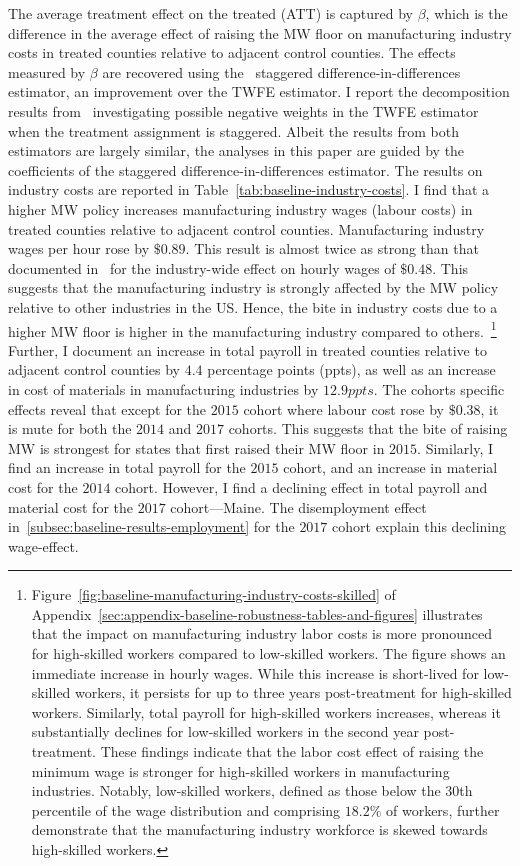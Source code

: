 \documentclass[12pt, english]{article}
\begin{document}
    The average treatment effect on the treated (ATT) is captured by $\beta$, which is the difference in the average effect of raising the MW floor on manufacturing industry costs in treated counties relative to adjacent control counties. The effects measured by $\beta$ are recovered using the~\cite{sun2021estimating} staggered difference-in-differences estimator, an improvement over the TWFE estimator. I report the decomposition results from~\cite{de2020two} investigating possible negative weights in the TWFE estimator when the treatment assignment is staggered. Albeit the results from both estimators are largely similar, the analyses in this paper are guided by the coefficients of the staggered difference-in-differences estimator. The results on industry costs are reported in Table~\ref{tab:baseline-industry-costs}. I find that a higher MW policy increases manufacturing industry wages (labour costs) in treated counties relative to adjacent control counties. Manufacturing industry wages per hour rose by $\$0.89$. This result is almost twice as strong than that documented in~\cite{gopalan2021state} for the industry-wide effect on hourly wages of $\$0.48$. This suggests that the manufacturing industry is strongly affected by the MW policy relative to other industries in the US. Hence, the bite in industry costs due to a higher MW floor is higher in the manufacturing industry compared to others.~\footnote{\tiny Figure~\ref{fig:baseline-manufacturing-industry-costs-skilled} of Appendix~\ref{sec:appendix-baseline-robustness-tables-and-figures} illustrates that the impact on manufacturing industry labor costs is more pronounced for high-skilled workers compared to low-skilled workers. The figure shows an immediate increase in hourly wages. While this increase is short-lived for low-skilled workers, it persists for up to three years post-treatment for high-skilled workers. Similarly, total payroll for high-skilled workers increases, whereas it substantially declines for low-skilled workers in the second year post-treatment. These findings indicate that the labor cost effect of raising the minimum wage is stronger for high-skilled workers in manufacturing industries. Notably, low-skilled workers, defined as those below the 30th percentile of the wage distribution and comprising $18.2\%$ of workers, further demonstrate that the manufacturing industry workforce is skewed towards high-skilled workers.} Further, I document an increase in total payroll in treated counties relative to adjacent control counties by $4.4$ percentage points (ppts), as well as an increase in cost of materials in manufacturing industries by $12.9ppts$. The cohorts specific effects reveal that except for the $2015$ cohort where labour cost rose by $\$0.38$, it is mute for both the $2014$ and $2017$ cohorts. This suggests that the bite of raising MW is strongest for states that first raised their MW floor in $2015$. Similarly, I find an increase in total payroll for the $2015$ cohort, and an increase in material cost for the $2014$ cohort. However, I find a declining effect in total payroll and material cost for the $2017$ cohort---Maine. The disemployment effect in~\ref{subsec:baseline-results-employment} for the $2017$ cohort explain this declining wage-effect.
    
\end{document}
